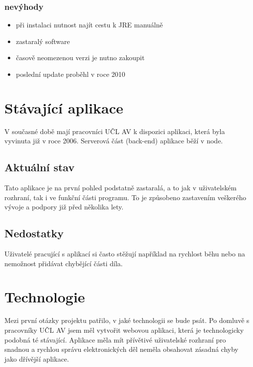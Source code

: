             \subsubsection{nevýhody}
                \begin{itemize}
                    \item při instalaci nutnost najít cestu k JRE manuálně
                    \item zastaralý software
                    \item časově neomezenou verzi je nutno zakoupit
                    \item poslední update proběhl v roce 2010
                \end{itemize}
                
    \section{Stávající aplikace}
        V současné době mají pracovníci UČL AV k dispozici aplikaci, která byla vyvinuta již v roce 2006. Serverová část (back-end) aplikace běží v node.
        
        \subsection{Aktuální stav}
        Tato aplikace je na první pohled podstatně zastaralá, a to jak v uživatelském rozhraní, tak i ve funkční části programu. To je způsobeno zastavením veškerého vývoje a podpory již před několika lety.

        \subsection{Nedostatky}
            Uživatelé pracující s aplikací si často stěžují například na rychlost běhu nebo na nemožnost přidávat chybějící části díla.
            
    \section{Technologie}
        Mezi první otázky projektu patřilo, v jaké technologii se bude psát. Po domluvě s pracovníky UČL AV jsem měl vytvořit webovou aplikaci, která je technologicky podobná té stávající. Aplikace měla mít přívětivé uživatelské rozhraní pro snadnou a rychlou správu elektronických děl neměla obsahovat zásadná chyby jako dřívější aplikace. 
        
